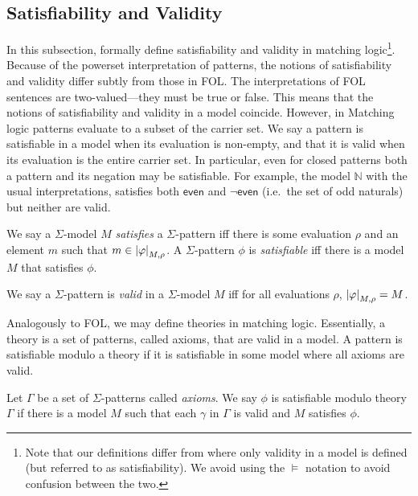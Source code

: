 \hypertarget{satisfiability-and-validity}{%
\subsection{Satisfiability and Validity}\label{satisfiability-and-validity}}

In this subsection, formally define satisfiability and validity in matching logic\footnote{
Note that our definitions differ from \cite{matchinglogiclmcs} where only validity in a model is defined (but referred to as satisfiability).
We avoid using the $\models$ notation to avoid confusion between the two.
}.
Because of the powerset interpretation of patterns, the notions of satisfiability and validity differ
subtly from those in FOL.
The interpretations of FOL sentences are two-valued---they must be true or false.
This means that the notions of satisfiability and validity in a model coincide.
However, in Matching logic patterns evaluate to a subset of the carrier set.
We say a pattern is satisfiable in a model when its evaluation is non-empty,
and that it is valid when its evaluation is the entire carrier set.
In particular, even for closed patterns both a pattern and its negation may be satisfiable.
For example, the model \(\mathbb N\) with the usual interpretations,
satisfies both \(\mathsf{even}\) and \(\lnot \mathsf{even}\) (i.e.~the set of odd naturals) but neither are valid.

\begin{definition}
We say a $\Sigma$-model $M$ \emph{satisfies} a $\Sigma$-pattern
iff there is some evaluation $\rho$ and an element $m$
such that $m \in \left| {\varphi} \right|_{M,\rho}$.
A $\Sigma$-pattern $\phi$ is \emph{satisfiable} iff there is a model $M$ that satisfies $\phi$.
\end{definition}

\begin{definition}
We say a $\Sigma$-pattern is \emph{valid} in a $\Sigma$-model $M$
iff for all evaluations $\rho$, $\left| {\varphi} \right|_{M,\rho} = M$.
\end{definition}

Analogously to FOL, we may define theories in matching logic.
Essentially, a theory is a set of patterns, called axioms, that are valid in a model.
A pattern is satisfiable modulo a theory if it is satisfiable in some model where all axioms are valid.

\begin{definition}
Let $\Gamma$ be a set of $\Sigma$-patterns called \emph{axioms}.
We say $\phi$ is satisfiable modulo theory $\Gamma$ if there is a model $M$
such that each $\gamma$ in $\Gamma$ is valid and $M$ satisfies $\phi$.
\end{definition}

